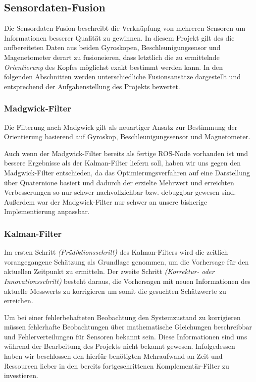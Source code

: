 
\subsection{Sensordaten-Fusion}
\label{headtracking_fusion_subsec}
Die Sensordaten-Fusion beschreibt die Verknüpfung von mehreren Sensoren um Informationen besserer Qualität zu gewinnen. In diesem Projekt gilt des die aufbereiteten Daten aus beiden Gyroskopen, Beschleunigungsensor und Magenetometer derart zu fusioneieren, dass letztlich die zu ermittelnde \emph{Orientierung} des Kopfes möglichst exakt bestimmt werden kann. In den folgenden Abschnitten werden unterschiedliche Fusionsansätze dargestellt und entsprechend der Aufgabenstellung des Projekts bewertet. 

\subsubsection{Madgwick-Filter}
Die Filterung nach Madgwick \cite{madgwick2010efficient} gilt als neuartiger Ansatz zur Bestimmung der Orientierung basierend auf Gyroskop, Beschleunigungssensor und Magnetometer.

Auch wenn der Madgwick-Filter bereits als fertige ROS-Node vorhanden ist und  bessere Ergebnisse als der Kalman-Filter liefern soll, haben wir uns gegen den Madgwick-Filter entschieden, da das Optimierungsverfahren auf eine Darstellung über Quaternione basiert und dadurch der erzielte Mehrwert und erreichten Verbesserungen so nur schwer nachvollziehbar bzw. debuggbar gewesen sind. Außerdem war der Madgwick-Filter nur schwer an unsere bisherige Implementierung anpassbar.

\subsubsection{Kalman-Filter}
Im ersten Schritt \emph{(Prädiktionsschritt)} des Kalman-Filters wird die zeitlich vorangegangene Schätzung als Grundlage genommen, um die Vorhersage für den aktuellen Zeitpunkt zu ermitteln. Der zweite Schritt \emph{(Korrektur- oder Innovationsschritt)} besteht daraus, die Vorhersagen mit neuen Informationen des aktuelle Messwerts zu korrigieren um somit die gesuchten Schätzwerte zu erreichen.

Um bei einer fehlerbehafteten Beobachtung den Systemzustand zu korrigieren müssen fehlerhafte Beobachtungen über mathematische Gleichungen beschreibbar und Fehlerverteilungen für Sensoren bekannt sein. Diese Informationen sind uns während der Bearbeitung des Projekts nicht bekannt gewesen. Infolgedessen haben wir beschlossen den hierfür benötigten Mehraufwand an Zeit und Ressourcen lieber in den bereits fortgeschrittenen Komplementär-Filter zu investieren.

